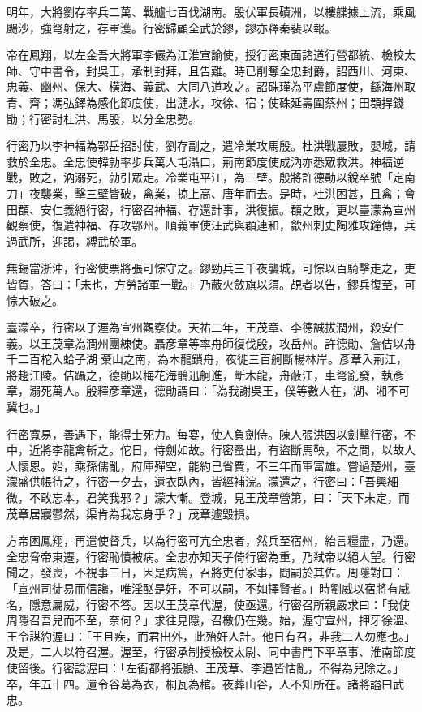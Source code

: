 \begin{pinyinscope}
 明年，大將劉存率兵二萬、戰艫七百伐湖南。殷伏軍長磧洲，以樓艓據上流，乘風颺沙，強弩射之，存軍濩。行密歸顧全武於鏐，鏐亦釋秦裴以報。



 帝在鳳翔，以左金吾大將軍李儼為江淮宣諭使，授行密東面諸道行營都統、檢校太師、守中書令，封吳王，承制封拜，且告難。時已削奪全忠封爵，詔西川、河東、忠義、幽州、保大、橫海、義武、大同八道攻之。詔硃瑾為平盧節度使，繇海州取青、齊；馮弘鐸為感化節度使，出漣水，攻徐、宿；使硃延壽圍蔡州；田頵捍錢勖；行密討杜洪、馬殷，以分全忠勢。



 行密乃以李神福為鄂岳招討使，劉存副之，遣冷業攻馬殷。杜洪戰屢敗，嬰城，請救於全忠。全忠使韓勍率步兵萬人屯灄口，荊南節度使成汭亦悉眾救洪。神福逆戰，敗之，汭溺死，勍引眾走。冷業屯平江，為三壁。殷將許德勛以銳卒號「定南刀」夜襲業，擊三壁皆破，禽業，掠上高、唐年而去。是時，杜洪困甚，且禽；會田頵、安仁義絕行密，行密召神福、存還計事，洪復振。頵之敗，更以臺濛為宣州觀察使，復遣神福、存攻鄂州。順義軍使汪武與頵連和，歙州刺史陶雅攻鐘傳，兵過武所，迎謁，縛武於軍。



 無錫當浙沖，行密使票將張可悰守之。鏐勁兵三千夜襲城，可悰以百騎擊走之，吏皆賀，答曰：「未也，方勞諸軍一戰。」乃蔽火斂旗以須。覘者以告，鏐兵復至，可悰大破之。



 臺濛卒，行密以子渥為宣州觀察使。天祐二年，王茂章、李德誠拔潤州，殺安仁義。以王茂章為潤州團練使。聶彥章等率舟師復伐殷，攻岳州。許德勛、詹佶以舟千二百柁入蛤子湖棄山之南，為木龍鎖舟，夜徙三百舸斷楊林岸。彥章入荊江，將趨江陵。佶躡之，德勛以梅花海鶻迅舸進，斷木龍，舟蔽江，車弩亂發，執彥章，溺死萬人。殷釋彥章還，德勛謂曰：「為我謝吳王，僕等數人在，湖、湘不可冀也。」



 行密寬易，善遇下，能得士死力。每宴，使人負劍侍。陳人張洪因以劍擊行密，不中，近將李龍禽斬之。佗日，侍劍如故。行密蚤出，有盜斷馬鞅，不之問，以故人人懷恩。始，乘孫儒亂，府庫殫空，能約己省費，不三年而軍富雄。嘗過楚州，臺濛盛供帳待之，行密一夕去，遺衣臥內，皆經補浣。濛還之，行密曰：「吾興細微，不敢忘本，君笑我邪？」濛大慚。登城，見王茂章營第，曰：「天下未定，而茂章居寢鬱然，渠肯為我忘身乎？」茂章遽毀損。



 方帝困鳳翔，再遣使督兵，以為行密可亢全忠者，然兵至宿州，紿言糧盡，乃還。全忠脅帝東遷，行密恥憤被病。全忠亦知天子倚行密為重，乃弒帝以絕人望。行密聞之，發喪，不視事三日，因是病篤，召將吏付家事，問嗣於其佐。周隱對曰：「宣州司徒易而信讒，唯淫酗是好，不可以嗣，不如擇賢者。」時劉威以宿將有威名，隱意屬威，行密不答。因以王茂章代渥，使亟還。行密召所親嚴求曰：「我使周隱召吾兒而不至，奈何？」求往見隱，召檄仍在幾。始，渥守宣州，押牙徐溫、王令謀約渥曰：「王且疾，而君出外，此殆奸人計。他日有召，非我二人勿應也。」及是，二人以符召渥。渥至，行密承制授檢校太尉、同中書門下平章事、淮南節度使留後。行密諗渥曰：「左衙都將張顥、王茂章、李遇皆怙亂，不得為兒除之。」卒，年五十四。遺令谷葛為衣，桐瓦為棺。夜葬山谷，人不知所在。諸將謚曰武忠。




\end{pinyinscope}
